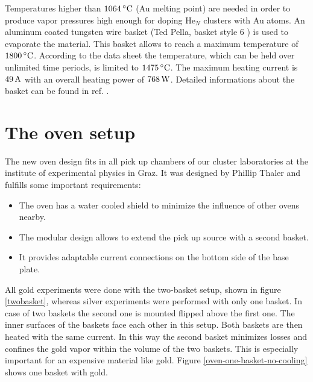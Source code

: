 \documentclass[parskip,12pt,headsepline,a4paper] {scrbook}
\begin{document}
Temperatures higher than $\unit[1064]{^\circ C}$ (Au melting point) are needed in order to produce vapor pressures high enough for doping He$_N$ clusters with Au atoms. An aluminum coated tungsten wire basket (Ted Pella, basket style 6 \cite{albasket}) is used to evaporate the material. This basket allows to reach a maximum temperature of $\unit[1800]{^\circ C}$. According to the data sheet the temperature, which can be held over unlimited time periods, is limited to $\unit[1475]{^\circ C}$. The maximum heating current is $\unit[49]{A}$ with an overall heating power of $\unit[768]{W}$. Detailed informations about the basket can be found in ref. \cite{albasket}. \\

\section{The oven setup}
\vspace{-0.5\baselineskip}
The new oven design fits in all pick up chambers of our cluster laboratories at the institute of experimental physics in Graz. It was designed by Phillip Thaler and fulfills some important requirements:
\begin{itemize}
\item The oven has a water cooled shield to minimize the influence of other ovens nearby.
\item The modular design allows to extend the pick up source with a second basket.
\item It provides adaptable current connections on the bottom side of the base plate.
\end{itemize}

All gold experiments were done with the two-basket setup, shown in figure \ref{twobasket}, whereas silver experiments were performed with only one basket. In case of two baskets the second one is mounted flipped above the first one. The inner surfaces of the baskets face each other in this setup. Both baskets are then heated with the same current. In this way the second basket minimizes losses and confines the gold vapor within the volume of the two baskets. This is especially important for an expensive material like gold. Figure \ref{oven-one-basket-no-cooling} shows one basket with gold.
\end{document}
